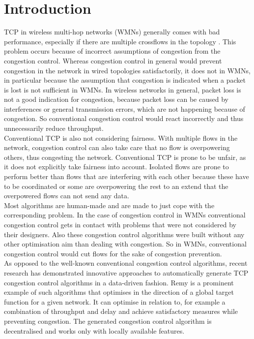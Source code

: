 \chapter{Introduction}\label{ch:introduction}
\glsresetall %



TCP in wireless multi-hop networks (WMNs) generally comes with bad performance, especially if there are multiple crossflows in the topology \cite{wcp}. This problem occurs because of incorrect assumptions of congestion from the congestion control. Whereas congestion control in general would prevent congestion in the network in wired topologies satisfactorily, it does not in WMNs, in particular because the assumption that congestion is indicated when a packet is lost is not sufficient in WMNs. In wireless networks in general, packet loss is not a good indication for congestion, because packet loss can be caused by interferences or general transmission errors, which are not happening because of congestion. So conventional congestion control would react incorrectly and thus unnecessarily reduce throughput. \\
Conventional TCP is also not considering fairness. With multiple flows in the network, congestion control can also take care that no flow is overpowering others, thus congesting the network. Conventional TCP is prone to be unfair, as it does not explicitly take fairness into account. Isolated flows are prone to perform better than flows that are interfering with each other because these have to be coordinated or some are overpowering the rest to an extend that the overpowered flows can not send any data. \\
Most algorithms are human-made and are made to just cope with the corresponding problem. In the case of congestion control in WMNs conventional congestion control gets in contact with problems that were not considered by their designers. Also these congestion control algorithms were built without any other optimisation aim than dealing with congestion. So in WMNs, conventional congestion control would cut flows for the sake of congestion prevention.\\
As opposed to the well-known conventional congestion control algorithms, recent research has demonstrated innovative approaches to automatically generate TCP congestion control algorithms in a data-driven fashion.
Remy \cite{remy} is a prominent example of such algorithms that optimises in the direction of a global target function for a given network. It can optimise in relation to, for example a combination of throughput and delay and achieve satisfactory measures while preventing congestion. The generated congestion control algorithm is decentralised and works only with locally available features.\\
